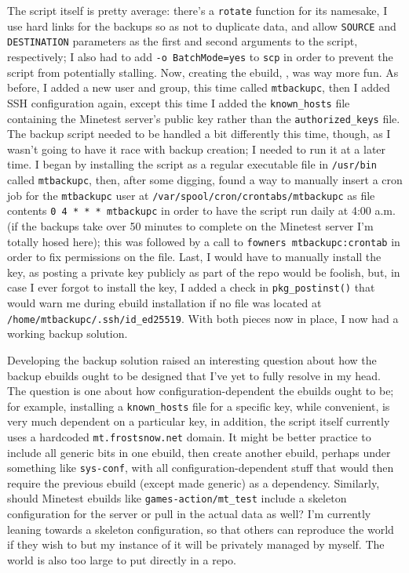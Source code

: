 \documentclass{article}
\begin{document}
The script itself is pretty average: there's a \texttt{rotate} function for its namesake, I use hard links for the backups so as not to duplicate data, and allow \texttt{SOURCE} and \texttt{DESTINATION} parameters as the first and second arguments to the script, respectively; I also had to add \texttt{-o BatchMode=yes} to \texttt{scp} in order to prevent the script from potentially stalling.  Now, creating the ebuild, , was way more fun.  As before, I added a new user and group, this time called \texttt{mtbackupc}, then I added SSH configuration again, except this time I added the \texttt{known_hosts} file containing the Minetest server's public key rather than the \texttt{authorized_keys} file.  The backup script needed to be handled a bit differently this time, though, as I wasn't going to have it race with backup creation; I needed to run it at a later time.  I began by installing the script as a regular executable file in \texttt{/usr/bin} called \texttt{mtbackupc}, then, after some digging, found a way to manually insert a cron job for the \texttt{mtbackupc} user at \texttt{/var/spool/cron/crontabs/mtbackupc} as file contents \texttt{0 4 * * * mtbackupc} in order to have the script run daily at 4:00 a.m. (if the backups take over 50 minutes to complete on the Minetest server I'm totally hosed here); this was followed by a call to \texttt{fowners mtbackupc:crontab} in order to fix permissions on the file.  Last, I would have to manually install the key, as posting a private key publicly as part of the repo would be foolish, but, in case I ever forgot to install the key, I added a check in \texttt{pkg_postinst()} that would warn me during ebuild installation if no file was located at \texttt{/home/mtbackupc/.ssh/id_ed25519}.  With both pieces now in place, I now had a working backup solution.

Developing the backup solution raised an interesting question about how the backup ebuilds ought to be designed that I've yet to fully resolve in my head.  The question is one about how configuration-dependent the ebuilds ought to be; for example, installing a \texttt{known_hosts} file for a specific key, while convenient, is very much dependent on a particular key, in addition, the script itself currently uses a hardcoded \texttt{mt.frostsnow.net} domain.  It might be better practice to include all generic bits in one ebuild, then create another ebuild, perhaps under something like \texttt{sys-conf}, with all configuration-dependent stuff that would then require the previous ebuild (except made generic) as a dependency.  Similarly, should Minetest ebuilds like \texttt{games-action/mt_test} include a skeleton configuration for the server or pull in the actual data as well?  I'm currently leaning towards a skeleton configuration, so that others can reproduce the world if they wish to but my instance of it will be privately managed by myself.  The world is also too large to put directly in a repo.
\end{document}
